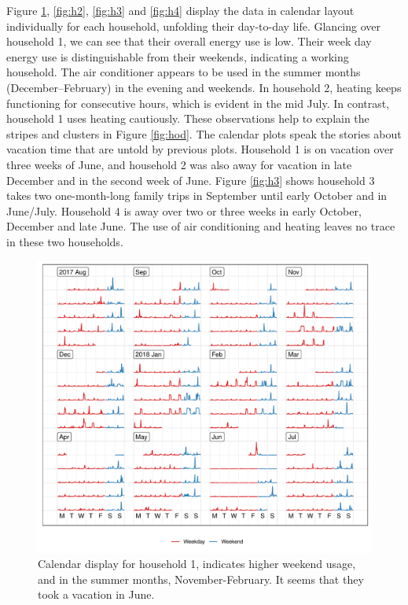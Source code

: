 \documentclass[12pt]{article}
\begin{document}
Figure \ref{fig:h1}, \ref{fig:h2}, \ref{fig:h3} and \ref{fig:h4} display
the data in calendar layout individually for each household, unfolding
their day-to-day life. Glancing over household 1, we can see that their
overall energy use is low. Their week day energy use is distinguishable
from their weekends, indicating a working household. The air conditioner
appears to be used in the summer months (December--February) in the
evening and weekends. In household 2, heating keeps functioning for
consecutive hours, which is evident in the mid July. In contrast,
household 1 uses heating cautiously. These observations help to explain
the stripes and clusters in Figure \ref{fig:hod}. The calendar plots
speak the stories about vacation time that are untold by previous plots.
Household 1 is on vacation over three weeks of June, and household 2 was
also away for vacation in late December and in the second week of June.
Figure \ref{fig:h3} shows household 3 takes two one-month-long family
trips in September until early October and in June/July. Household 4 is
away over two or three weeks in early October, December and late June.
The use of air conditioning and heating leaves no trace in these two
households.

\begin{figure}

{\centering \includegraphics[width=\textwidth]{figure/h1-1} 

}

\caption{Calendar display for household 1, indicates higher weekend usage, and in the summer months, November-February. It seems that they took a vacation in June.}\label{fig:h1}
\end{figure}
\end{document}
